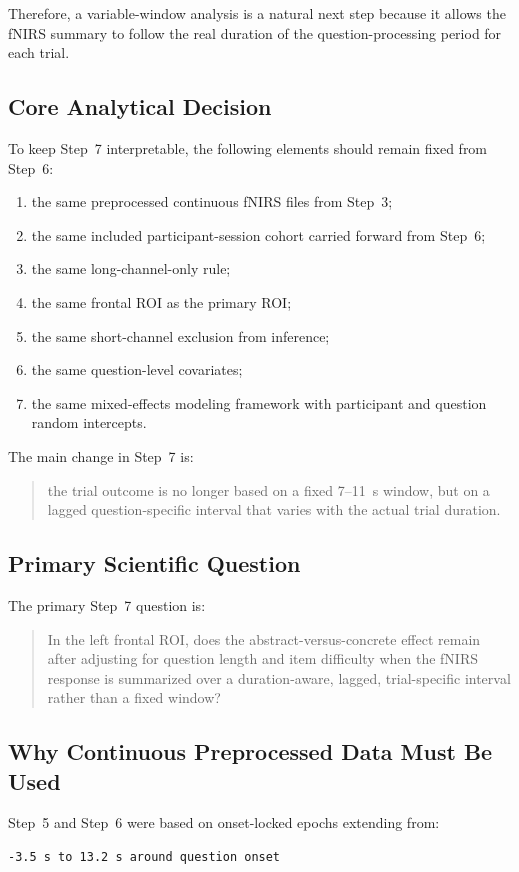 Therefore, a variable-window analysis is a natural next step because it allows the fNIRS summary
to follow the real duration of the question-processing period for each trial.

\subsection{Core Analytical Decision}
To keep Step~7 interpretable, the following elements should remain fixed from Step~6:
\begin{enumerate}
    \item the same preprocessed continuous fNIRS files from Step~3;
    \item the same included participant-session cohort carried forward from Step~6;
    \item the same long-channel-only rule;
    \item the same frontal ROI as the primary ROI;
    \item the same short-channel exclusion from inference;
    \item the same question-level covariates;
    \item the same mixed-effects modeling framework with participant and question random intercepts.
\end{enumerate}

The main change in Step~7 is:
\begin{quote}
the trial outcome is no longer based on a fixed 7--11~s window, but on a lagged
question-specific interval that varies with the actual trial duration.
\end{quote}

\subsection{Primary Scientific Question}
The primary Step~7 question is:
\begin{quote}
In the left frontal ROI, does the abstract-versus-concrete effect remain after adjusting for
question length and item difficulty when the fNIRS response is summarized over a duration-aware,
lagged, trial-specific interval rather than a fixed window?
\end{quote}

\subsection{Why Continuous Preprocessed Data Must Be Used}
Step~5 and Step~6 were based on onset-locked epochs extending from:
\begin{verbatim}
-3.5 s to 13.2 s around question onset
\end{verbatim}

